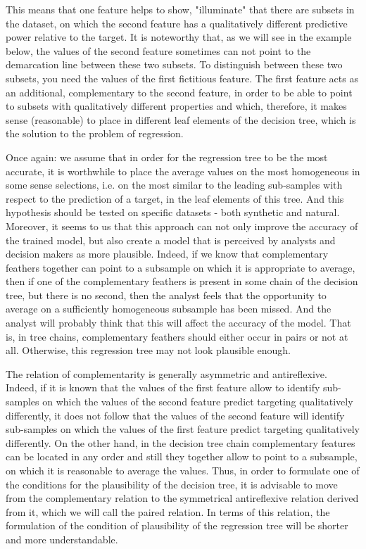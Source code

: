 \documentclass[conference]{IEEEtran}
\begin{document}
This means that one feature helps to show, "illuminate" that there are subsets in the dataset, on which the second feature has a qualitatively different predictive power relative to the target. It is noteworthy that, as we will see in the example below, the values of the second feature sometimes can not point to the demarcation line between these two subsets. To distinguish between these two subsets, you need the values of the first fictitious feature. The first feature acts as an additional, complementary to the second feature, in order to be able to point to subsets with qualitatively different properties and which, therefore, it makes sense (reasonable) to place in different leaf elements of the decision tree, which is the solution to the problem of regression.


Once again: we assume that in order for the regression tree to be the most accurate, it is worthwhile to place the average values on the most homogeneous in some sense selections, i.e. on the most similar to the leading sub-samples with respect to the prediction of a target, in the leaf elements of this tree. And this hypothesis should be tested on specific datasets - both synthetic and natural. Moreover, it seems to us that this approach can not only improve the accuracy of the trained model, but also create a model that is perceived by analysts and decision makers as more plausible. Indeed, if we know that complementary feathers together can point to a subsample on which it is appropriate to average, then if one of the complementary feathers is present in some chain of the decision tree, but there is no second, then the analyst feels that the opportunity to average on a sufficiently homogeneous subsample has been missed. And the analyst will probably think that this will affect the accuracy of the model. That is, in tree chains, complementary feathers should either occur in pairs or not at all. Otherwise, this regression tree may not look plausible enough.


The relation of complementarity is generally asymmetric and antireflexive. Indeed, if it is known that the values of the first feature allow to identify sub-samples on which the values of the second feature predict targeting qualitatively differently, it does not follow that the values of the second feature will identify sub-samples on which the values of the first feature predict targeting qualitatively differently. On the other hand, in the decision tree chain complementary features can be located in any order and still they together allow to point to a subsample, on which it is reasonable to average the values. Thus, in order to formulate one of the conditions for the plausibility of the decision tree, it is advisable to move from the complementary relation to the symmetrical antireflexive relation derived from it, which we will call the paired relation. In terms of this relation, the formulation of the condition of plausibility of the regression tree will be shorter and more understandable.
\end{document}
